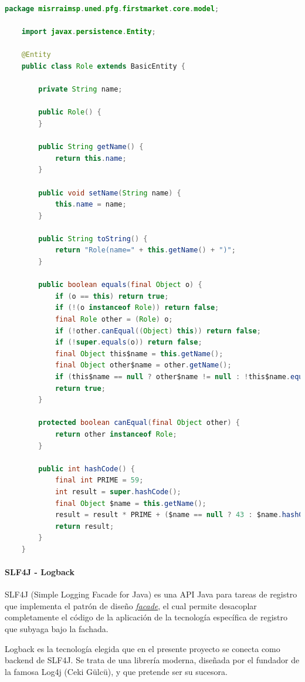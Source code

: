 \documentclass[a4paper]{article}
\begin{document}
    \begin{lstlisting}[language=Java,caption=Clase \emph{Role} tras efectuar un \emph{Delombok},label=list:lombok_open]
    package misrraimsp.uned.pfg.firstmarket.core.model;
    
    import javax.persistence.Entity;
    
    @Entity
    public class Role extends BasicEntity {
    
	    private String name;
	    
	    public Role() {
	    }
	    
	    public String getName() {
	    	return this.name;
	    }
	    
	    public void setName(String name) {
	    	this.name = name;
	    }
	    
	    public String toString() {
	    	return "Role(name=" + this.getName() + ")";
	    }
	    
	    public boolean equals(final Object o) {
		    if (o == this) return true;
		    if (!(o instanceof Role)) return false;
		    final Role other = (Role) o;
		    if (!other.canEqual((Object) this)) return false;
		    if (!super.equals(o)) return false;
		    final Object this$name = this.getName();
		    final Object other$name = other.getName();
		    if (this$name == null ? other$name != null : !this$name.equals(other$name)) return false;
		    return true;
	    }
	    
	    protected boolean canEqual(final Object other) {
	    	return other instanceof Role;
	    }
	    
	    public int hashCode() {
		    final int PRIME = 59;
		    int result = super.hashCode();
		    final Object $name = this.getName();
		    result = result * PRIME + ($name == null ? 43 : $name.hashCode());
		    return result;
	    }
    }
    \end{lstlisting}
    
    \paragraph{SLF4J - Logback}
    SLF4J (Simple Logging Facade for Java) es una API Java para tareas de registro que implementa el patrón de diseño \href{https://en.wikipedia.org/wiki/Facade_pattern}{\emph{facade}}, el cual permite desacoplar completamente el código de la aplicación de la tecnología específica de registro que subyaga bajo la fachada.
    
    Logback es la tecnología elegida que en el presente proyecto se conecta como backend de SLF4J. Se trata de una librería moderna, diseñada por el fundador de la famosa Log4j (Ceki Gülcü), y que pretende ser su sucesora.
    
\end{document}
